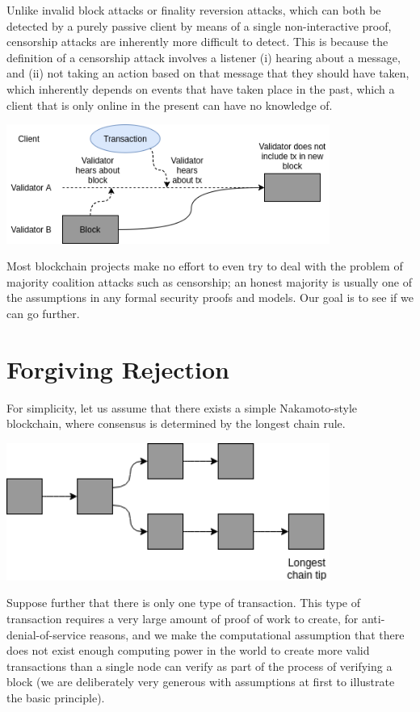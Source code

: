 \documentclass[12pt]{article}
\begin{document}
Unlike invalid block attacks or finality reversion attacks, which can both be detected by a purely passive client by means of a single non-interactive proof, censorship attacks are inherently more difficult to detect. This is because the definition of a censorship attack involves a listener (i) hearing about a message, and (ii) not taking an action based on that message that they should have taken, which inherently depends on events that have taken place in the past, which a client that is only online in the present can have no knowledge of.

\includegraphics[width=400px]{Censorship1.png}

Most blockchain projects make no effort to even try to deal with the problem of majority coalition attacks such as censorship; an honest majority is usually one of the assumptions in any formal security proofs and models. Our goal is to see if we can go further.

\section{Forgiving Rejection}

For simplicity, let us assume that there exists a simple Nakamoto-style blockchain, where consensus is determined by the longest chain rule.

\includegraphics[width=400px]{Censorship2.png}

Suppose further that there is only one type of transaction. This type of transaction requires a very large amount of proof of work to create, for anti-denial-of-service reasons, and we make the computational assumption that there does not exist enough computing power in the world to create more valid transactions than a single node can verify as part of the process of verifying a block (we are deliberately very generous with assumptions at first to illustrate the basic principle).
\end{document}
